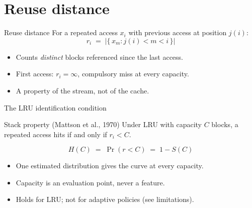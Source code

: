 \section{Reuse distance}

\begin{frame}{Reuse distance}
  For a repeated access $x_i$ with previous access at position $j(i)$:
  \begin{equation*}
    r_i \;=\; \bigl|\{\, x_m : j(i) < m < i \,\}\bigr|
  \end{equation*}
  \begin{itemize}
    \item Counts \emph{distinct} blocks referenced since the last access.
    \item First access: $r_i = \infty$, compulsory miss at every capacity.
    \item A property of the stream, not of the cache.
  \end{itemize}
\end{frame}

\begin{frame}{The LRU identification condition}
  \begin{block}{Stack property (Mattson et al., 1970)}
    Under LRU with capacity $C$ blocks, a repeated access hits if and only if
    $r_i < C$.
  \end{block}
  \begin{equation*}
    H(C) \;=\; \Pr(r < C) \;=\; 1 - S(C)
  \end{equation*}
  \begin{itemize}
    \item One estimated distribution gives the curve at every capacity.
    \item Capacity is an evaluation point, never a feature.
    \item Holds for LRU; not for adaptive policies (see limitations).
  \end{itemize}
\end{frame}
